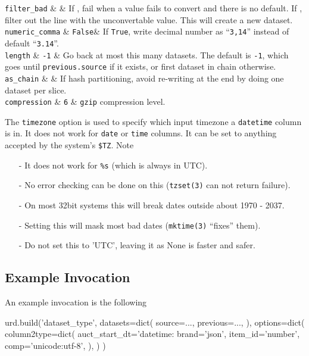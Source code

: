   \RP \texttt{filter\_bad} & \pyFalse & If \pyFalse, fail when a value
  fails to convert and there is no default.  If \pyTrue, filter out
  the line with the unconvertable value.  This will create a new dataset.\\

  \RP \texttt{numeric\_comma} & \texttt{False}&
  If \texttt{True}, write decimal number as
  ``\texttt{3,14}'' instead of default ``\texttt{3.14}''.\\

  \RP \texttt{length} & \texttt{-1} & Go back at most this many
  datasets. The default is \texttt{-1}, which goes
  until \texttt{previous.source} if it exists, or first dataset in
  chain otherwise.\\

  \RP \texttt{as\_chain} & \pyFalse & If hash partitioning, avoid
  re-writing at the end by doing one dataset per slice.\\

  \RP \texttt{compression} & \texttt{6} & \texttt{gzip} compression level.\\
\stoptable

\noindent The \texttt{timezone} option is used to specify which input
timezone a \texttt{datetime} column is in.  It does not work for
\texttt{date} or \texttt{time} columns.  It can be set to anything
accepted by the system's \texttt{\$TZ}.  Note
\begin{itemize}
\item[-] It does not work for \texttt{\%s} (which is always in UTC).
\item[-] No error checking can be done on this (\texttt{tzset(3)} can not return failure).
\item[-] On most 32bit systems this will break dates outside about 1970 - 2037.
\item[-] Setting this will mask most bad dates (\texttt{mktime(3)} ``fixes'' them).
\item[-] Do not set this to 'UTC', leaving it as None is faster and safer.
\end{itemize}



\subsection{Example Invocation}
An example invocation is the following
\begin{python}
urd.build('dataset_type',
    datasets=dict(
        source=...,
        previous=...,
    ),
    options=dict(
        column2type=dict(
            auct_start_dt='datetime:%
            brand='json',
            item_id='number',
            comp='unicode:utf-8',
        ),
    )
)
\end{python}


